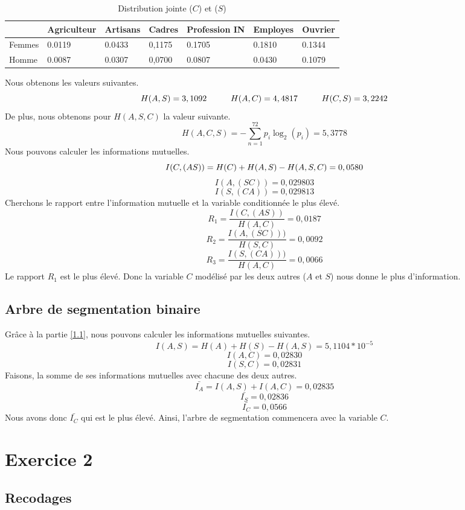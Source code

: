 \documentclass{article}
\begin{document}
\begin{table}[H]
  \centering
  \begin{tabular}{|l|l|l|l|l|l|l|}
  \hline
         & Agriculteur & Artisans & Cadres & Profession IN & Employes & Ouvrier \\ \hline
    Femmes & 0.0119      & 0.0433   & 0,1175 & 0.1705        & 0.1810   & 0.1344  \\ \hline
    Homme  & 0.0087      & 0.0307   & 0,0700 & 0.0807        & 0.0430   & 0.1079  \\ \hline
    \end{tabular}
    \caption{Distribution jointe ($C$) et ($S$)}
\end{table}
Nous obtenons les valeurs suivantes.
\[
H(A,S)=3,1092 \hspace{1 cm} H(A,C)= 4,4817 \hspace{1cm} H(C,S)=3,2242
\]
De plus, nous obtenons pour $H(A,S,C)$ la valeur suivante.
\[
  H(A,C,S) = -\sum_{n = 1}^{72}p_i\log_2(p_i)=5,3778
\]
Nous pouvons calculer les informations mutuelles.
\[
I(C,(AS))=H(C)+H(A,S)-H(A,S,C) = 0,0580 \\
\]
\[
I(A,(SC))= 0,029803
\]
\[
I(S,(CA))=0,029813
\]
Cherchons le rapport entre l'information mutuelle et la variable conditionnée le plus élevé.
\[
R_1 = \frac{I(C,(AS))}{H(A,C)}=0,0187
\]
\[
R_2 = \frac{I(A,(SC)))}{H(S,C)}=0,0092
\]
\[
R_3 = \frac{I(S,(CA)))}{H(A,C)}=0,0066
\]
Le rapport $R_1$ est le plus élevé. Donc la variable $C$ modélisé par les deux autres ($A$ et $S$) nous donne le plus d'information.
\subsection{Arbre de segmentation binaire}
Grâce à la partie \ref{1.1}, nous pouvons calculer les informations mutuelles suivantes.
\[
I(A,S) = H(A) + H(S) - H(A,S) = 5,1104*10^{-5}
\]
\[
I(A,C) = 0,02830
\]
\[
I(S,C)= 0,02831
\]
Faisons, la somme de ses informations mutuelles avec chacune des deux autres.
\[
\bar{I_A} = I(A,S) + I(A,C) = 0,02835
\]
\[
\bar{I_S}= 0,02836 
\]
\[
\bar{I_C} = 0,0566
\]
Nous avons donc $\bar{I_C}$ qui est le plus élevé. Ainsi, l'arbre de segmentation commencera avec la variable $C$.






\newpage
\section{Exercice 2}
\label{exercice2}
\subsection{Recodages}
\end{document}
